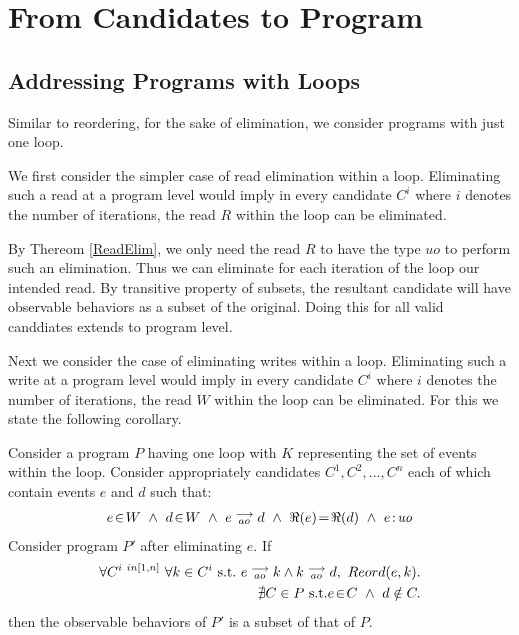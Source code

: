 \section{From Candidates to Program}



    

    \subsection{Addressing Programs with Loops}
    
        Similar to reordering, for the sake of elimination, we consider programs with just one loop. 
        
        We first consider the simpler case of read elimination within a loop. 
        Eliminating such a read at a program level would imply in every candidate $C^i$ where $i$ denotes the number of iterations, the read $R$ within the loop can be eliminated.
        
        By Thereom \ref{ReadElim}, we only need the read $R$ to have the type $uo$ to perform such an elimination.
        Thus we can eliminate for each iteration of the loop our intended read. 
        By transitive property of subsets, the resultant candidate will have observable behaviors as a subset of the original. 
        Doing this for all valid canddiates extends to program level.

        Next we consider the case of eliminating writes within a loop. 
        Eliminating such a write at a program level would imply in every candidate $C^i$ where $i$ denotes the number of iterations, the read $W$ within the loop can be eliminated.
        For this we state the following corollary.
        \begin{corollary}
            Consider a program $P$ having one loop with $K$ representing the set of events within the loop. Consider appropriately candidates $C^1, C^2, ... , C^n$ each of which contain events $e$ and $d$ such that:
            \begin{align*}
                \event{e}{W} \ \wedge \ \event{d}{W} \ \wedge \ \reln{e}{ao}{d} \ \wedge \ \Re(e)\!=\!\Re(d) \ \wedge \ \et{e}{uo}
            \end{align*}
            Consider program $P'$ after eliminating $e$. 
            If
            \begin{align*}
                  \forall C^{i \ in [1,n]} \ \forall k \in C^i \ \text{s.t.} \ \reln{e}{ao}{k} \wedge \reln{k}{ao}{d}, \ Reord(e,k). \\ 
                  \nexists C \in P \ \text{s.t.} \event{e}{C} \ \wedge \  d \notin C.
            \end{align*}
            then the observable behaviors of $P'$ is a subset of that of $P$. 
        \end{corollary}


